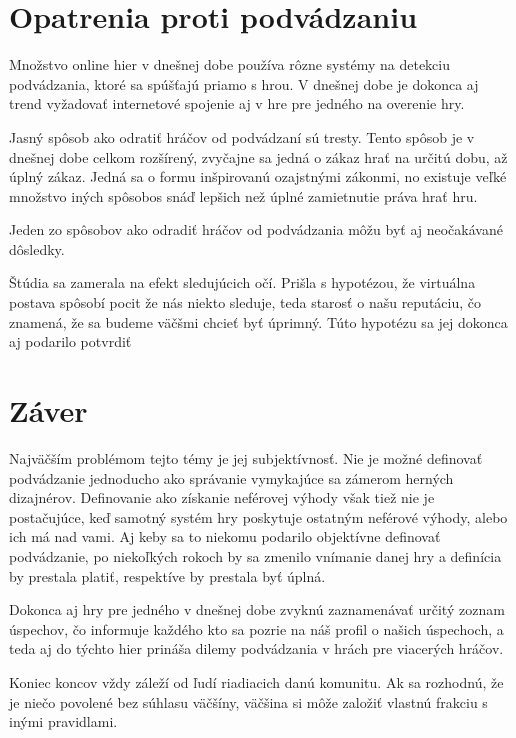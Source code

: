 \documentclass[10pt, oneside, slovak,a4paper]{article}
\begin{document}
\section{Opatrenia proti podvádzaniu}

Množstvo online hier v dnešnej dobe používa rôzne systémy na detekciu podvádzania, ktoré sa spúšťajú priamo s hrou. V dnešnej dobe je dokonca aj trend vyžadovať internetové spojenie aj v hre pre jedného na overenie hry.

Jasný spôsob ako odratiť hráčov od podvádzaní sú tresty. Tento spôsob je v dnešnej dobe celkom rozšírený, zvyčajne sa jedná o zákaz hrať na určitú dobu, až úplný zákaz. Jedná sa o formu inšpirovanú ozajstnými zákonmi, no existuje veľké množstvo iných spôsobos snáď lepšich než úplné zamietnutie práva hrať hru.

Jeden zo spôsobov ako odradiť hráčov od podvádzania môžu byť aj neočakávané dôsledky. 

Štúdia sa zamerala na efekt sledujúcich očí. Prišla s hypotézou, že virtuálna postava spôsobí pocit že nás niekto sleduje, teda starosť o našu reputáciu, čo znamená, že sa budeme väčšmi chcieť byť úprimný. \cite{not_alone} Túto hypotézu sa jej dokonca aj podarilo potvrdiť

\section{Záver} 

 Najväčším problémom tejto témy je jej subjektívnosť. Nie je možné definovať podvádzanie jednoducho ako správanie vymykajúce sa zámerom herných dizajnérov. Definovanie ako získanie neférovej výhody však tiež nie je postačujúce, keď samotný systém hry poskytuje ostatným neférové výhody, alebo ich má nad vami. Aj keby sa to niekomu podarilo objektívne definovať podvádzanie, po niekoľkých rokoch by sa zmenilo vnímanie danej hry a definícia by prestala platiť, respektíve by prestala byť úplná.

 Dokonca aj hry pre jedného v dnešnej dobe zvyknú zaznamenávať určitý zoznam úspechov, čo informuje každého kto sa pozrie na náš profil o našich úspechoch, a teda aj do týchto hier prináša dilemy podvádzania v hrách pre viacerých hráčov.

Koniec koncov vždy záleží od ľudí riadiacich danú komunitu. Ak sa rozhodnú, že je niečo povolené bez súhlasu väčšíny, väčšina si môže založiť vlastnú frakciu s inými pravidlami.



\nocite{*}


\end{document}
